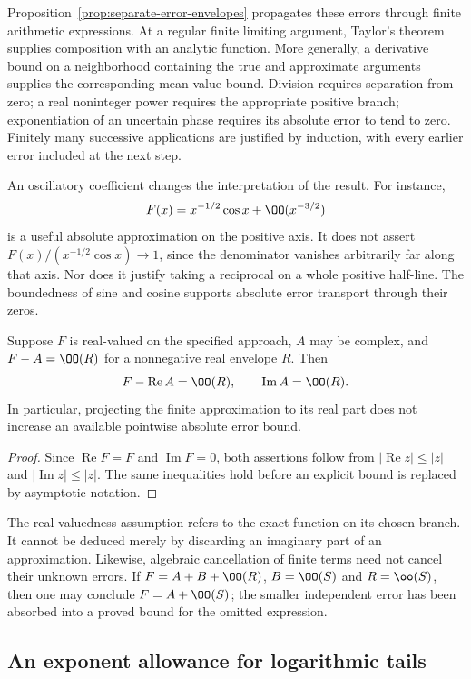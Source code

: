 Proposition~\ref{prop:separate-error-envelopes} propagates these errors
through finite arithmetic expressions. At a regular finite limiting
argument, Taylor's theorem supplies composition with an analytic
function. More generally, a derivative bound on a neighborhood containing
the true and approximate arguments supplies the corresponding
mean-value bound. Division requires separation from zero; a real
noninteger power requires the appropriate positive branch; exponentiation
of an uncertain phase requires its absolute error to tend to zero.
Finitely many successive applications are justified by induction, with
every earlier error included at the next step.

An oscillatory coefficient changes the interpretation of the result.
For instance,
\[
 F(x)=x^{-1/2}\cos x+\OO(x^{-3/2})
\]
is a useful absolute approximation on the positive axis. It does not
assert $F(x)/(x^{-1/2}\cos x)\to1$, since the denominator vanishes
arbitrarily far along that axis. Nor does it justify taking a reciprocal
on a whole positive half-line. The boundedness of sine and cosine
supports absolute error transport through their zeros.

\begin{proposition}
\label{prop:special-function-real-projection}
Suppose $F$ is real-valued on the specified approach, $A$ may be complex,
and $F-A=\OO(R)$ for a nonnegative real envelope $R$. Then
\[
 F-\operatorname{Re}A=\OO(R),
 \qquad \operatorname{Im}A=\OO(R).
\]
In particular, projecting the finite approximation to its real part
does not increase an available pointwise absolute error bound.
\end{proposition}
\begin{proof}
Since $\operatorname{Re}F=F$ and $\operatorname{Im}F=0$, both assertions
follow from $|\operatorname{Re}z|\le|z|$ and
$|\operatorname{Im}z|\le|z|$. The same inequalities hold before an
explicit bound is replaced by asymptotic notation.
\end{proof}

The real-valuedness assumption refers to the exact function on its
chosen branch. It cannot be deduced merely by discarding an imaginary
part of an approximation. Likewise, algebraic cancellation of finite
terms need not cancel their unknown errors. If
$F=A+B+\OO(R)$, $B=\OO(S)$ and $R=\oo(S)$, then one may conclude
$F=A+\OO(S)$; the smaller independent error has been absorbed into a
proved bound for the omitted expression.

\subsection{An exponent allowance for logarithmic tails}


